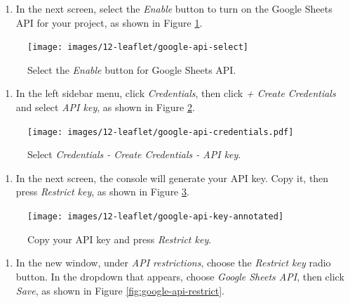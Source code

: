 \documentclass[
  english,
]{book}
\providecommand{\tightlist}{%
  \setlength{\itemsep}{0pt}\setlength{\parskip}{0pt}}
\begin{document}
\begin{enumerate}
\def\labelenumi{\arabic{enumi}.}
\setcounter{enumi}{5}
\tightlist
\item
  In the next screen, select the \emph{Enable} button to turn on the Google Sheets API for your project, as shown in Figure \ref{fig:google-api-select}.
\end{enumerate}



\begin{figure}
\texttt{[image: images/12-leaflet/google-api-select]} \caption{Select the \emph{Enable} button for Google Sheets API.}\label{fig:google-api-select}
\end{figure}

\begin{enumerate}
\def\labelenumi{\arabic{enumi}.}
\setcounter{enumi}{6}
\tightlist
\item
  In the left sidebar menu, click \emph{Credentials}, then click \emph{+ Create Credentials} and select \emph{API key}, as shown in Figure \ref{fig:google-api-credentials}.
\end{enumerate}



\begin{figure}
\centering
\texttt{[image: images/12-leaflet/google-api-credentials.pdf]}
\caption{\label{fig:google-api-credentials}Select \emph{Credentials - Create Credentials - API key}.}
\end{figure}

\begin{enumerate}
\def\labelenumi{\arabic{enumi}.}
\setcounter{enumi}{7}
\tightlist
\item
  In the next screen, the console will generate your API key. Copy it, then press \emph{Restrict key}, as shown in Figure \ref{fig:google-api-key}.
\end{enumerate}



\begin{figure}
\texttt{[image: images/12-leaflet/google-api-key-annotated]} \caption{Copy your API key and press \emph{Restrict key}.}\label{fig:google-api-key}
\end{figure}

\begin{enumerate}
\def\labelenumi{\arabic{enumi}.}
\setcounter{enumi}{8}
\tightlist
\item
  In the new window, under \emph{API restrictions}, choose the \emph{Restrict key} radio button. In the dropdown that appears, choose \emph{Google Sheets API}, then click \emph{Save}, as shown in Figure \ref{fig:google-api-restrict}.
\end{enumerate}
\end{document}
